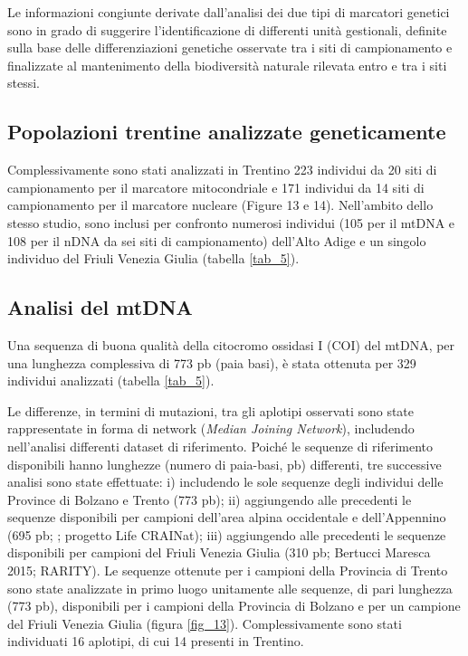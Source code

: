 \documentclass[11pt,a4paper,italian,twoside,openany]{memoir}
\begin{document}
Le informazioni congiunte derivate dall'analisi dei due tipi di marcatori genetici sono in grado di suggerire l'identificazione di differenti unità gestionali, definite sulla base delle differenziazioni genetiche osservate tra i siti di campionamento e finalizzate al mantenimento della biodiversità naturale rilevata entro e tra i siti stessi. 

\subsection{Popolazioni trentine analizzate geneticamente}
Complessivamente sono stati analizzati in Trentino 223 individui da 20 siti di campionamento per il marcatore mitocondriale e 171 individui da 14 siti di campionamento per il marcatore nucleare (Figure 13 e 14). Nell'ambito dello stesso studio, sono inclusi per confronto numerosi individui (105 per il mtDNA e 108 per il nDNA da sei siti di campionamento) dell'Alto Adige e un singolo individuo del Friuli Venezia Giulia (tabella \ref{tab_5}).

\subsection{Analisi del mtDNA}
Una sequenza di buona qualità della citocromo ossidasi I (COI) del mtDNA, per una lunghezza complessiva di 773 pb (paia basi), è stata ottenuta per 329 individui analizzati (tabella \ref{tab_5}).

Le differenze, in termini di mutazioni, tra gli aplotipi osservati sono state rappresentate in forma di network (\emph{Median Joining Network}), includendo nell'analisi differenti dataset di riferimento. Poiché le sequenze di riferimento disponibili hanno lunghezze (numero di paia-basi, pb) differenti, tre successive analisi sono state effettuate: i) includendo le sole sequenze degli individui delle Province di Bolzano e Trento (773 pb); ii) aggiungendo alle precedenti le sequenze disponibili per campioni dell'area alpina occidentale e dell'Appennino (695 pb; \cite{Bernini 2016}; progetto Life CRAINat); iii) aggiungendo alle precedenti le sequenze disponibili per campioni del Friuli Venezia Giulia (310 pb; Bertucci Maresca 2015; RARITY).
Le sequenze ottenute per i campioni della Provincia di Trento sono state analizzate in primo luogo unitamente alle sequenze, di pari lunghezza (773 pb), disponibili per i campioni della Provincia di Bolzano e per un campione del Friuli Venezia Giulia (figura \ref{fig_13}). Complessivamente sono stati individuati 16 aplotipi, di cui 14 presenti in Trentino. 
\end{document}

